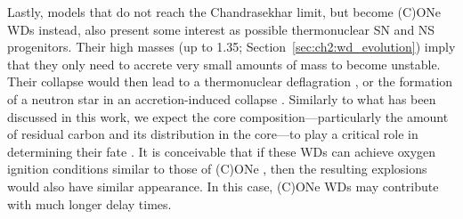 \documentclass[main.tex]{subfiles}
\begin{document}
Lastly,  models that do not reach the Chandrasekhar limit, but become (C)ONe WDs instead, also 
present some interest as possible thermonuclear SN and NS progenitors. Their high masses (up to 1.35\msun; Section~\ref{sec:ch2:wd_evolution}) 
imply that they only need to accrete very small amounts of mass to become unstable. Their collapse would then lead to a thermonuclear deflagration
\citep{Meng:2014qta,Willcox:2016yyp,Bravo:2019fwh}, or the formation of a neutron star in an accretion-induced collapse \citep[e.g.,][]{Nomoto:1991abc,Tauris:2013zna,Ruiter:2018ouw,Wang:2020pzc}. Similarly to what has been discussed in this work, we expect the core composition---particularly the amount of residual carbon and its distribution in the core---to play a critical role in determining their fate \citep{brooks2017}. It is conceivable that if these WDs can achieve oxygen ignition conditions similar to those of (C)ONe \ias, then the resulting explosions would also have similar appearance. In this case, (C)ONe WDs may contribute \ias with much longer delay times.    
\end{document}
